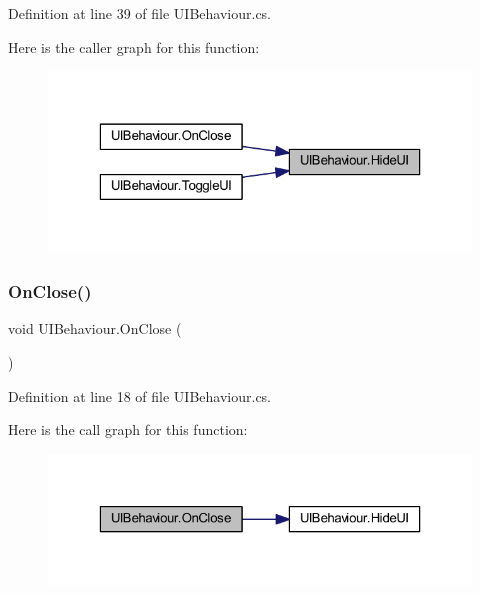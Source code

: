 Definition at line 39 of file U\+I\+Behaviour.\+cs.

Here is the caller graph for this function\+:
\nopagebreak
\begin{figure}[H]
\begin{center}
\leavevmode
\includegraphics[width=323pt]{class_u_i_behaviour_a16ec3362b1f53b371aa8c5a8a3ec80e7_icgraph}
\end{center}
\end{figure}
\mbox{\label{class_u_i_behaviour_a058150104cbc5deee5bb2d2c8811380a}} 
\subsubsection{\texorpdfstring{OnClose()}{OnClose()}}
{\footnotesize\ttfamily void U\+I\+Behaviour.\+On\+Close (\begin{DoxyParamCaption}{ }\end{DoxyParamCaption})}



Definition at line 18 of file U\+I\+Behaviour.\+cs.

Here is the call graph for this function\+:
\nopagebreak
\begin{figure}[H]
\begin{center}
\leavevmode
\includegraphics[width=323pt]{class_u_i_behaviour_a058150104cbc5deee5bb2d2c8811380a_cgraph}
\end{center}
\end{figure}
\mbox{\label{class_u_i_behaviour_a14585d2d40b493d7999564d8a51d51c5}} 
